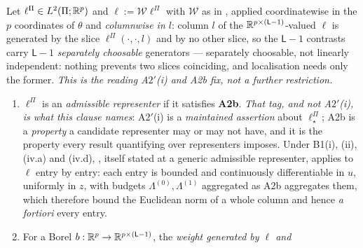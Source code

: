 \begin{definition}\label{def:weight}
Let $\ell^\Pi\in L^{2}(\Pi;\mathbb{R}^{p})$ and $\ell:=\mathcal W\ell^\Pi$ with $\mathcal W$ as in
, applied coordinatewise in the $p$ coordinates of $\theta$ and \emph{columnwise in $l$}:
column $l$ of the $\mathbb{R}^{p\times(\mathsf L-1)}$-valued $\ell$ is generated by the slice
$\ell^\Pi(\cdot,\cdot,l)$ and by no other slice, so the $\mathsf L-1$ contrasts carry $\mathsf L-1$
\emph{separately choosable} generators --- separately choosable, not linearly independent: nothing
prevents two slices coinciding, and localisation needs only the former. \emph{This is the reading
A$2'$(i) and A2b fix, not a further restriction.}
\begin{enumerate}
\item[(a)] $\ell^\Pi$ is an \emph{admissible representer} if it satisfies \textbf{A2b}. \emph{That tag,
and not A$2'$(i), is what this clause names}: A$2'$(i) is a \emph{maintained assertion} about
$\ell^\Pi_\star$; A2b is a \emph{property} a candidate representer may or may not have, and it is the
property every result quantifying over representers imposes. Under B1(i), (ii), (iv.a) and (iv.d),
, itself stated at a generic admissible representer, applies to $\ell$
entry by entry: each entry is bounded and continuously differentiable in $u$, uniformly in $z$, with
budgets $\Lambda^{(0)},\Lambda^{(1)}$ aggregated as A2b aggregates them, which therefore bound the
Euclidean norm of a whole column and hence \emph{a fortiori} every entry.
%
\item[(b)] For a Borel $b:\mathbb{R}^{p}\to\mathbb{R}^{p\times(\mathsf L-1)}$, the \emph{weight generated by $\ell$ and
}
\end{enumerate}
\end{definition}
